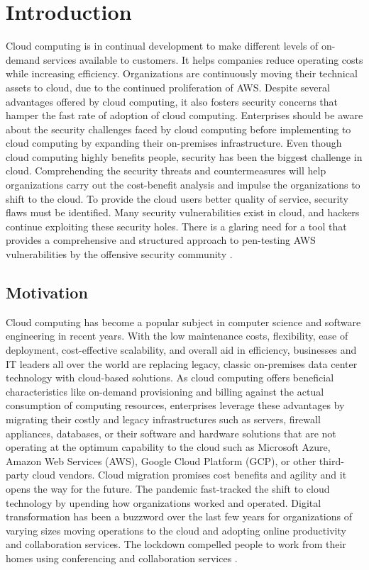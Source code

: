
\chapter{Introduction}

\par Cloud computing is in continual development to make different levels of on-demand services available to customers.
It helps companies reduce operating costs while increasing efficiency.
Organizations are continuously moving their technical assets to cloud, due to the continued proliferation of AWS. Despite several advantages offered by cloud computing, it also fosters security concerns that hamper the fast rate of adoption of cloud computing.
Enterprises should
be aware about the security challenges
faced
by
cloud computing before implementing to cloud
computing by expanding their
on-premises
infrastructure.
Even though cloud computing highly benefits people,
security has been the biggest challenge in cloud.
Comprehending the security threats and countermeasures will help organizations carry out the cost-benefit analysis and impulse the organizations to shift to the cloud.
To provide the cloud users better quality of service, security flaws must
be identified.
Many security vulnerabilities exist in cloud, and hackers
continue exploiting these security holes.
There is a glaring need for a tool that provides a comprehensive and structured approach to pen-testing AWS vulnerabilities by the offensive security community \cite{2}.

\section{Motivation}
\par Cloud computing has become a
popular subject in computer science and software
engineering in recent years.
With the low maintenance costs, flexibility, ease of deployment, cost-effective scalability, and overall aid in efficiency, businesses and IT leaders all over the world are replacing legacy, classic on-premises data center technology with cloud-based solutions.
As cloud computing offers beneficial characteristics like
on-demand provisioning and billing against the actual
consumption of computing resources, enterprises leverage
these advantages by migrating their costly and legacy
infrastructures such as servers, firewall appliances,
databases, or their software and hardware solutions that
are not operating at the optimum capability to the cloud
such as Microsoft Azure, Amazon Web Services (AWS), Google
Cloud Platform (GCP), or other third-party cloud vendors.
Cloud migration promises cost benefits and agility and it opens the way for the future.
The pandemic fast-tracked the shift to cloud technology by upending how organizations worked and operated.
Digital transformation has been a buzzword over the last few years for organizations of varying sizes moving operations to the cloud and adopting online productivity and collaboration services. The lockdown compelled people to work from their homes using conferencing and collaboration services \cite{2}.


